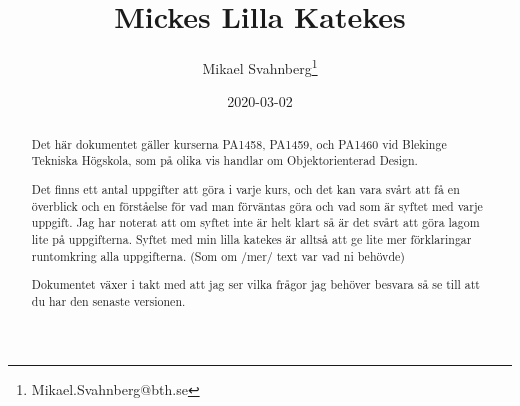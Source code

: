\documentclass[8pt,oneside]{memoir}
\author{Mikael Svahnberg\thanks{Mikael.Svahnberg@bth.se}}
\date{2020-03-02}
\title{Mickes Lilla Katekes}
\renewcommand{\maketitle}{}
\begin{document}
\maketitle
\thispagestyle{empty} %


\newpage %


\begin{abstract}
Det här dokumentet gäller kurserna PA1458, PA1459, och PA1460 vid Blekinge Tekniska Högskola, som på olika vis handlar om Objektorienterad Design.

Det finns ett antal uppgifter att göra i varje kurs, och det kan vara svårt att få en överblick och en förståelse för vad man förväntas göra och vad som är syftet med varje uppgift. Jag har noterat att om syftet inte är helt klart så är det svårt att göra lagom lite på uppgifterna. Syftet med min lilla katekes är alltså att ge lite mer förklaringar runtomkring alla uppgifterna. (Som om /mer/ text var vad ni behövde) 

Dokumentet växer i takt med att jag ser vilka frågor jag behöver besvara så se till att du har den senaste versionen.
\end{abstract}
\end{document}
